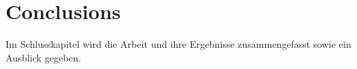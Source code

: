 \chapter{Conclusions}
Im Schlusskapitel wird die Arbeit und ihre Ergebnisse zusammengefasst sowie ein Ausblick gegeben.